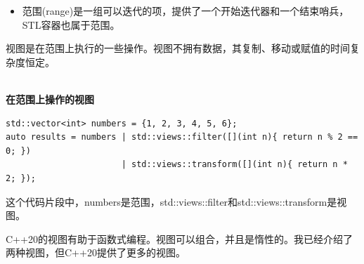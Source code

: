 \begin{itemize}
\item 
范围(range)是一组可以迭代的项，提供了一个开始迭代器和一个结束哨兵，STL容器也属于范围。
\end{itemize}

视图是在范围上执行的一些操作。视图不拥有数据，其复制、移动或赋值的时间复杂度恒定。

\hspace*{\fill} \\ %
\noindent
\textbf{在范围上操作的视图}
\begin{lstlisting}[style=styleCXX]
std::vector<int> numbers = {1, 2, 3, 4, 5, 6};
auto results = numbers | std::views::filter([](int n){ return n % 2 == 0; })
                       | std::views::transform([](int n){ return n * 2; });
\end{lstlisting}

这个代码片段中，numbers是范围，std::views::filter和std::views::transform是视图。

C++20的视图有助于函数式编程。视图可以组合，并且是惰性的。我已经介绍了两种视图，但C++20提供了更多的视图。

